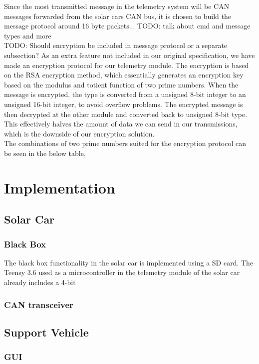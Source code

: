 \documentclass[conference]{IEEEtran}
\newcommand{\todo}[1]{{\color{olive} TODO: #1}}
\begin{document}
Since the most transmitted message in the telemetry system will be CAN messages forwarded from the solar cars CAN bus, it is chosen to build the message protocol around 16 byte packets... \todo{talk about cmd and message types and more}\\
\todo{Should encryption be included in message protocol or a separate subsection?}
As an extra feature not included in our original specification, we have made an encryption protocol for our telemetry module. The encryption is based on the RSA encryption method, which essentially generates an encryption key based on the modulus and totient function of two prime numbers. When the message is encrypted, the type is converted from a unsigned 8-bit integer to an unsigned 16-bit integer, to avoid overflow problems. The encrypted message is then decrypted at the other module and converted back to unsigned 8-bit type. This effectively halves the amount of data we can send in our transmissions, which is the downside of our encryption solution.\\
The combinations of two prime numbers suited for the encryption protocol can be seen in the below table, 



\section{Implementation}

\subsection{Solar Car} 
\subsubsection{Black Box} %

The black box functionality in the solar car is implemented using a SD card. The Teensy 3.6 used as a microcontroller in the telemetry module of the solar car already includes a 4-bit 

\subsubsection{CAN transceiver}
\subsection{Support Vehicle}
\subsubsection{GUI} %
\end{document}
